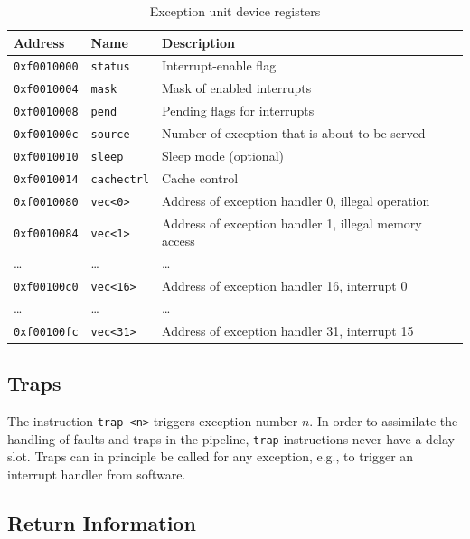 \documentclass[a4paper,fontsize=10pt,twoside,DIV15,BCOR12mm,headinclude=true,footinclude=false,pagesize,bibtotoc]{scrbook}
\begin{document}
\begin{table}[b]
  \centering
  \begin{tabular}{llp{}}
    \toprule
    Address             & Name             & Description \\
    \midrule
    \texttt{0xf0010000} & \texttt{status} & Interrupt-enable flag \\
    \texttt{0xf0010004} & \texttt{mask} & Mask of enabled interrupts \\
    \texttt{0xf0010008} & \texttt{pend} & Pending flags for interrupts \\
    \texttt{0xf001000c} & \texttt{source} & Number of exception that
    is about to be served \\
    \texttt{0xf0010010} & \texttt{sleep} & Sleep mode (optional) \\
    \texttt{0xf0010014} & \texttt{cachectrl} & Cache control \\
    \cmidrule{1-3}
    \texttt{0xf0010080} & \texttt{vec<0>} & Address of exception handler 0, illegal operation \\
    \texttt{0xf0010084} & \texttt{vec<1>} & Address of exception handler 1, illegal memory access \\
    \dots & \dots & \dots \\
    \cmidrule{1-3}
    \texttt{0xf00100c0} & \texttt{vec<16>} & Address of exception handler 16, interrupt 0 \\
    \dots & \dots & \dots \\
    \texttt{0xf00100fc} & \texttt{vec<31>} & Address of exception handler 31, interrupt 15 \\
    \bottomrule
  \end{tabular}
  \caption{Exception unit device registers}
  \label{tab:excioregs}
\end{table}

\subsection{Traps}

The instruction \texttt{trap <n>} triggers exception number $n$. In
order to assimilate the handling of faults and traps in the pipeline,
\texttt{trap} instructions never have a delay slot. Traps can in
principle be called for any exception, e.g., to trigger an interrupt
handler from software.

\subsection{Return Information}
\end{document}

